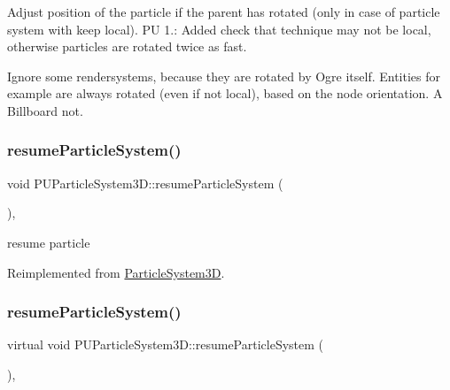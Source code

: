 Adjust position of the particle if the parent has rotated (only in case of particle system with \textquotesingle{}keep local\textquotesingle{}). PU 1.\+: Added check that technique may not be local, otherwise particles are rotated twice as fast.

Ignore some rendersystems, because they are rotated by Ogre itself. Entities for example are always rotated (even if not local), based on the node orientation. A Billboard not.\mbox{\label{classPUParticleSystem3D_a3a7be465950fdb5ad401eb436ec8ff32}} 
\subsubsection{\texorpdfstring{resume\+Particle\+System()}{resumeParticleSystem()}\hspace{0.1cm}{\footnotesize\ttfamily [1/2]}}
{\footnotesize\ttfamily void P\+U\+Particle\+System3\+D\+::resume\+Particle\+System (\begin{DoxyParamCaption}{ }\end{DoxyParamCaption})\hspace{0.3cm}{\ttfamily [override]}, {\ttfamily [virtual]}}

resume particle 

Reimplemented from \hyperlink{classParticleSystem3D_ac5f7a2d3bd35d5243e2e90578b8daed3}{Particle\+System3D}.

\mbox{\label{classPUParticleSystem3D_a02c88addf5387a7062e6418d6e8584c4}} 
\subsubsection{\texorpdfstring{resume\+Particle\+System()}{resumeParticleSystem()}\hspace{0.1cm}{\footnotesize\ttfamily [2/2]}}
{\footnotesize\ttfamily virtual void P\+U\+Particle\+System3\+D\+::resume\+Particle\+System (\begin{DoxyParamCaption}{ }\end{DoxyParamCaption})\hspace{0.3cm}{\ttfamily [override]}, {\ttfamily [virtual]}}

